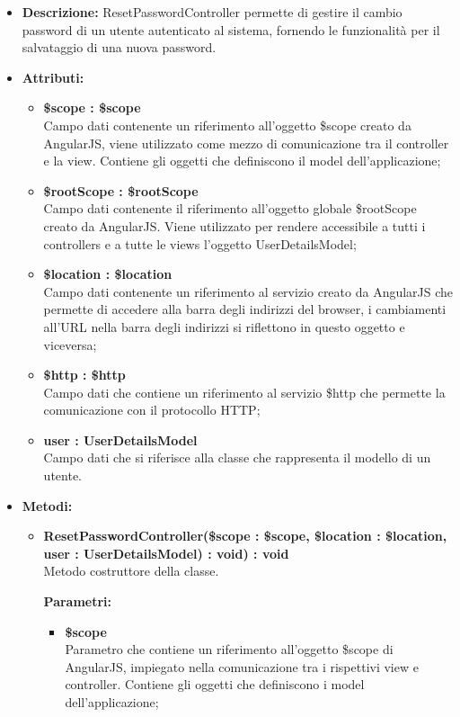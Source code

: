 \begin{itemize}
	\item \textbf{Descrizione:} ResetPasswordController permette di gestire il cambio password di un
utente autenticato al sistema, fornendo le funzionalità per il salvataggio di una nuova password.
	\item \textbf{Attributi:}
		\begin{itemize}
		
			\item \textbf{\$scope : \$scope}\\
			Campo dati contenente un riferimento all'oggetto \$scope creato da AngularJS, viene utilizzato come mezzo di comunicazione tra il controller e la view. Contiene gli oggetti che definiscono il model dell'applicazione;
			
			\item \textbf{\$rootScope : \$rootScope}\\
			Campo dati contenente il riferimento all'oggetto globale \$rootScope creato da AngularJS. Viene utilizzato per rendere accessibile a tutti i controllers e a tutte le views l'oggetto UserDetailsModel;
			
			\item \textbf{\$location : \$location}\\
			Campo dati contenente un riferimento al servizio creato da AngularJS che permette di accedere alla barra degli indirizzi del browser, i cambiamenti all'URL nella barra degli indirizzi si riflettono in questo oggetto e viceversa;

			\item \textbf{\$http : \$http }\\
			Campo dati che contiene un riferimento al servizio \$http che permette la comunicazione con il protocollo HTTP;
				
			\item \textbf{user : UserDetailsModel }\\
			Campo dati che si riferisce alla classe che rappresenta il modello di un utente.
				
		\end{itemize}
	\item \textbf{Metodi:}
		\begin{itemize}
		
			\item \textbf{ResetPasswordController(\$scope : \$scope, \$location : \$location, user : UserDetailsModel) : void) : void}\\
			Metodo costruttore della classe.
			\begin{description}
    			\item[\textbf{Parametri:}]
			\end{description}
			\begin{itemize}
				\item \textbf{\$scope}\\
				Parametro che contiene un riferimento all'oggetto \$scope di AngularJS, impiegato nella comunicazione tra i rispettivi view e controller. Contiene gli oggetti che definiscono i model dell'applicazione;
				

\end{itemize}
\end{itemize}
\end{itemize}
